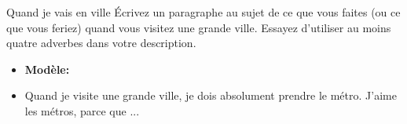 \begin{frame}{Quand je vais en ville}
  Écrivez un paragraphe au sujet de ce que vous faites (ou ce que vous feriez) quand vous visitez une grande ville.
  Essayez d'utiliser au moins  quatre \alert{adverbes} dans votre description.
  \begin{itemize}
    \item[] \textbf{Modèle:}
    \item Quand je visite une grande ville, je dois \alert{absolument} prendre le métro. J'aime les métros, parce que ...
  \end{itemize}
\end{frame}